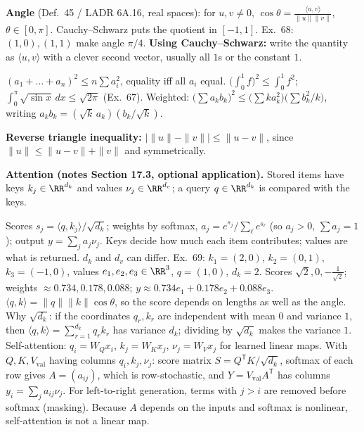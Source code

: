 \documentclass[10pt]{scrartcl}
\newcommand{\ip}[2]{\langle #1,#2\rangle}
\begin{document}
\begin{itemize}
  \ii \textbf{Angle} (Def.~45 / LADR 6A.16, real spaces): for $u,v\ne0$, $\cos\theta=\frac{\ip uv}{\|u\|\|v\|}$, $\theta\in[0,\pi]$. Cauchy--Schwarz puts the quotient in $[-1,1]$. Ex.~68: $(1,0),(1,1)$ make angle $\pi/4$.
  \ii \textbf{Using Cauchy--Schwarz:} write the quantity as $\ip uv$ with a clever second vector, usually all $1$s or the constant $1$.
  \begin{itemize}
    \ii $(a_1+\dots+a_n)^2\le n\sum a_i^2$, equality iff all $a_i$ equal.
    \ii $\big(\int_0^1f\big)^2\le\int_0^1f^2$; $\int_0^\pi\sqrt{\sin x}\,dx\le\sqrt{2\pi}$ (Ex.~67).
    \ii Weighted: $\big(\sum a_kb_k\big)^2\le\big(\sum ka_k^2\big)\big(\sum b_k^2/k\big)$, writing $a_kb_k=(\sqrt k\,a_k)(b_k/\sqrt k)$.
  \end{itemize}
  \ii \textbf{Reverse triangle inequality:} $\big|\|u\|-\|v\|\big|\le\|u-v\|$, since $\|u\|\le\|u-v\|+\|v\|$ and symmetrically.
\end{itemize}

\textbf{Attention (notes Section 17.3, optional application).} Stored items have keys $k_j\in\RR^{d_k}$ and values $\nu_j\in\RR^{d_v}$; a query $q\in\RR^{d_k}$ is compared with the keys.
\begin{itemize}
  \ii Scores $s_j=\ip q{k_j}/\sqrt{d_k}$; weights by softmax, $a_j=e^{s_j}/\sum_\ell e^{s_\ell}$ (so $a_j>0$, $\sum a_j=1$); output $y=\sum_ja_j\nu_j$. Keys decide how much each item contributes; values are what is returned. $d_k$ and $d_v$ can differ.
  \ii Ex.~69: $k_1=(2,0)$, $k_2=(0,1)$, $k_3=(-1,0)$, values $e_1,e_2,e_3\in\RR^3$, $q=(1,0)$, $d_k=2$. Scores $\sqrt2,0,-\frac1{\sqrt2}$; weights $\approx0.734,0.178,0.088$; $y\approx0.734e_1+0.178e_2+0.088e_3$.
  \ii $\ip qk=\|q\|\|k\|\cos\theta$, so the score depends on lengths as well as the angle. Why $\sqrt{d_k}$: if the coordinates $q_r,k_r$ are independent with mean $0$ and variance $1$, then $\ip qk=\sum_{r=1}^{d_k}q_rk_r$ has variance $d_k$; dividing by $\sqrt{d_k}$ makes the variance $1$.
  \ii Self-attention: $q_i=W_Qx_i$, $k_j=W_Kx_j$, $\nu_j=W_Vx_j$ for learned linear maps. With $Q,K,V_{\mathrm{val}}$ having columns $q_i,k_j,\nu_j$: score matrix $S=Q^{\mathsf T}K/\sqrt{d_k}$, softmax of each row gives $A=(a_{ij})$, which is row-stochastic, and $Y=V_{\mathrm{val}}A^{\mathsf T}$ has columns $y_i=\sum_ja_{ij}\nu_j$. For left-to-right generation, terms with $j>i$ are removed before softmax (masking). Because $A$ depends on the inputs and softmax is nonlinear, self-attention is not a linear map.
\end{itemize}
\end{document}
